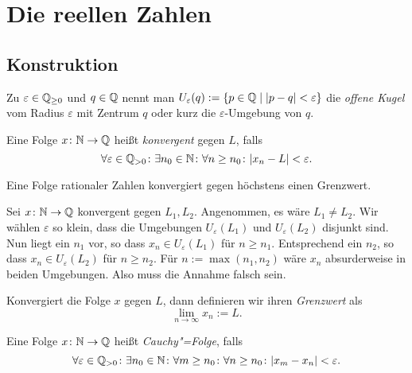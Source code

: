 \newpage
\section{Die reellen Zahlen}

\subsection{Konstruktion}

\begin{Definition}\newlinefirst
Zu $\varepsilon\in\mathbb Q_{\ge 0}$ und $q\in\mathbb Q$ nennt man
$U_\varepsilon(q):=\{p\in\mathbb Q\mid |p-q|<\varepsilon\}$
die \emph{offene Kugel} vom Radius $\varepsilon$ mit Zentrum $q$ oder
kurz die $\varepsilon$-Umgebung von $q$.
\end{Definition}

\begin{Definition}\newlinefirst
Eine Folge $x\colon\mathbb N\to\mathbb Q$ heißt \emph{konvergent} gegen $L$, falls
\[\forall\varepsilon\in\mathbb Q_{>0}\colon\exists n_0\in\mathbb N\colon\forall n\ge n_0\colon |x_n-L| < \varepsilon.\]
\end{Definition}

\begin{Satz}
Eine Folge rationaler Zahlen konvergiert gegen höchstens einen Grenzwert.
\end{Satz}
\begin{Beweis}
Sei $x\colon\mathbb N\to\mathbb Q$ konvergent gegen $L_1,L_2$. Angenommen, es wäre $L_1\ne L_2$.
Wir wählen $\varepsilon$ so klein, dass die Umgebungen $U_\varepsilon(L_1)$
und $U_\varepsilon(L_2)$ disjunkt sind. Nun liegt ein $n_1$ vor,
so dass $x_n\in U_\varepsilon(L_1)$ für $n\ge n_1$. Entsprechend ein
$n_2$, so dass $x_n\in U_\varepsilon(L_2)$ für $n\ge n_2$. Für
$n:=\max(n_1,n_2)$ wäre $x_n$ absurderweise in beiden Umgebungen.
Also muss die Annahme falsch sein.\,\qedsymbol
\end{Beweis}

\begin{Definition}[Grenzwert]\newlinefirst
Konvergiert die Folge $x$ gegen $L$, dann definieren wir ihren \emph{Grenzwert} als
\[\lim_{n\to\infty} x_n := L.\]
\end{Definition}

\begin{Definition}\newlinefirst
Eine Folge $x\colon\mathbb N\to\mathbb Q$ heißt \emph{Cauchy"=Folge}, falls
\[\forall\varepsilon\in\mathbb Q_{>0}\colon\exists n_0\in\mathbb N\colon
\forall m\ge n_0\colon\forall n\ge n_0\colon |x_m - x_n| < \varepsilon.\]
\end{Definition}

